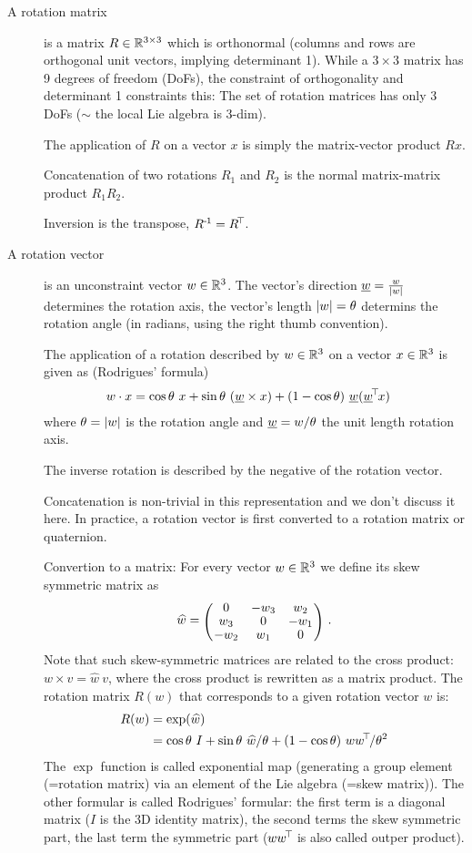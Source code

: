 \begin{description}
\item[A rotation matrix] is a matrix $R\in{\mathbb{R}}^{3\times3}$ which is orthonormal
(columns and rows are orthogonal unit vectors, implying determinant
1). While a $3\times3$ matrix has 9 degrees of freedom (DoFs), the
constraint of orthogonality and determinant 1 constraints this: The
set of rotation matrices has only 3 DoFs ($\sim$ the local Lie algebra
is 3-dim).

The application of $R$ on a vector $x$ is simply the matrix-vector
product $R x$.

Concatenation of two rotations $R_1$ and $R_2$ is the normal
matrix-matrix product $R_1 R_2$.

Inversion is the transpose, $R^{{\hspace*{-.0pt}\text{\rm -}\hspace*{-.5pt}}1} = R^{\!\top\!}$.

\item[A rotation vector] is an unconstraint vector $w\in{\mathbb{R}}^3$. The
vector's direction $\underline w = \frac{w}{|w|}$ determines the rotation
axis, the vector's length $|w|=\theta$ determins the rotation angle (in
radians, using the right thumb convention).

The application of a rotation described by $w\in{\mathbb{R}}^3$ on a vector
$x\in{\mathbb{R}}^3$ is given as (Rodrigues' formula)
\begin{align}
w \cdot x
 &= \cos\theta~ x
  + \sin\theta~ (\underline w\times x)
  + (1-\cos\theta)~ \underline w(\underline w^{\!\top\!} x)
\end{align}
where $\theta=|w|$ is the rotation angle and $\underline w=w/\theta$ the unit length
rotation axis.

The inverse rotation is described by the negative of the rotation
vector.

Concatenation is non-trivial in this representation and we don't
discuss it here. In practice, a rotation vector is first converted to
a rotation matrix or quaternion.

Convertion to a matrix: For every vector $w\in{\mathbb{R}}^3$ we define its skew
symmetric matrix as
\begin{align}
\hat w = \mat{ccc}{0 & -w_3 & w_2 \\ w_3 & 0 & -w_1 \\-w_2 & w_1 & 0} ~.
\end{align}
Note that such skew-symmetric matrices are related to the cross
product: $w \times v = \hat w~ v$, where the cross product is
rewritten as a matrix product. The rotation matrix $R(w)$ that
corresponds to a given rotation vector $w$ is:
\begin{align}\label{eqRodriguez}
R(w)
 &= \exp(\widehat w) \\
 &= \cos\theta~ I + \sin\theta~ \widehat w/\theta + (1-\cos\theta)~ w w^{\!\top\!}/\theta^2
\end{align}
The $\exp$ function is called exponential map (generating a group
element (=rotation matrix) via an element of the Lie algebra (=skew
matrix)). The other formular is called Rodrigues' formular: the first
term is a diagonal matrix ($I$ is the 3D identity matrix), the second
terms the skew symmetric part, the last term the symmetric part ($w
w^{\!\top\!}$ is also called outper product).


\end{description}
